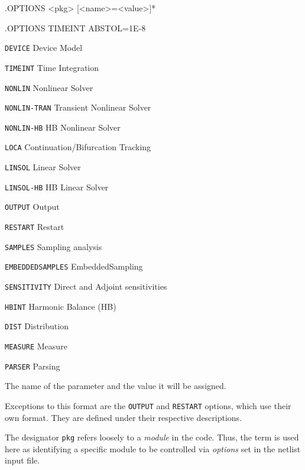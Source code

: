 \begin{Command}
\format
.OPTIONS <pkg> [<name>=<value>]*

\examples
.OPTIONS TIMEINT ABSTOL=1E-8

\arguments

\begin{Arguments}


\begin{basedescript}{
    \desclabelstyle{\multilinelabel}
    \desclabelwidth{1.5in}
    \renewcommand{\makelabel}[1]{\tt #1\hfill}}
  \item[\tt DEVICE]       Device Model
  \item[\tt TIMEINT]      Time Integration
  \item[\tt NONLIN]       Nonlinear Solver
  \item[\tt NONLIN-TRAN]  Transient Nonlinear Solver
  \item[\tt NONLIN-HB]    HB Nonlinear Solver
  \item[\tt LOCA]         Continuation/Bifurcation Tracking
  \item[\tt LINSOL]       Linear Solver
  \item[\tt LINSOL-HB]    HB Linear Solver
  \item[\tt OUTPUT]       Output
  \item[\tt RESTART]      Restart
  \item[\tt SAMPLES]      Sampling analysis
  \item[\tt EMBEDDEDSAMPLES]  EmbeddedSampling
  \item[\tt SENSITIVITY]  Direct and Adjoint sensitivities
  \item[\tt HBINT]        Harmonic Balance (HB)
  \item[\tt DIST]         Distribution
  \item[\tt MEASURE]      Measure
  \item[\tt PARSER]       Parsing
\end{basedescript}

The name of the parameter and the value it will be assigned.

\end{Arguments}

\comments

Exceptions to this format are the \texttt{OUTPUT} and \texttt{RESTART}
options, which use their own format. They are defined under their
respective descriptions.

The designator \texttt{pkg} refers loosely to a {\em module} in the
code.  Thus, the term is used here as identifying a specific module to
be controlled via {\em options} set in the netlist input file.

\end{Command}

